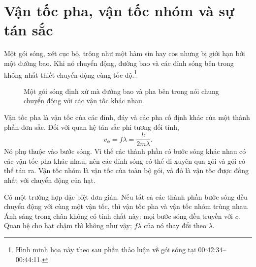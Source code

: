 \section{Vận tốc pha, vận tốc nhóm và sự tán sắc}

\begin{classroomqa}
\end{classroomqa}

Một gói sóng, xét cục bộ, trông như một hàm sin hay cos nhưng bị giới hạn bởi một đường bao. Khi nó chuyển động, đường bao và các đỉnh sóng bên trong không nhất thiết chuyển động cùng tốc độ.\footnote{Hình minh họa này theo sau phần thảo luận về gói sóng tại 00:42:34--00:44:11.}

\begin{figure}[t]
\centering
{}
\caption{Một gói sóng định xứ mà đường bao và pha bên trong nói chung chuyển động với các vận tốc khác nhau.}
\end{figure}

Vận tốc pha là vận tốc của các đỉnh, đáy và các pha cố định khác của một thành phần đơn sắc. Đối với quan hệ tán sắc phi tương đối tính,
\begin{equation}
v_\phi=f\lambda=\frac{h}{2m\lambda}.
\end{equation}
Nó phụ thuộc vào bước sóng. Vì thế các thành phần có bước sóng khác nhau có các vận tốc pha khác nhau, nên các đỉnh sóng có thể đi xuyên qua gói và gói có thể tán ra. Vận tốc nhóm là vận tốc của toàn bộ gói, và đó là vận tốc được đồng nhất với chuyển động của hạt.

Có một trường hợp đặc biệt đơn giản. Nếu tất cả các thành phần bước sóng đều chuyển động với cùng một vận tốc, thì vận tốc pha và vận tốc nhóm trùng nhau. Ánh sáng trong chân không có tính chất này: mọi bước sóng đều truyền với \(c\). Quan hệ cho hạt chậm thì không như vậy; \(f\lambda\) của nó thay đổi theo \(\lambda\).

